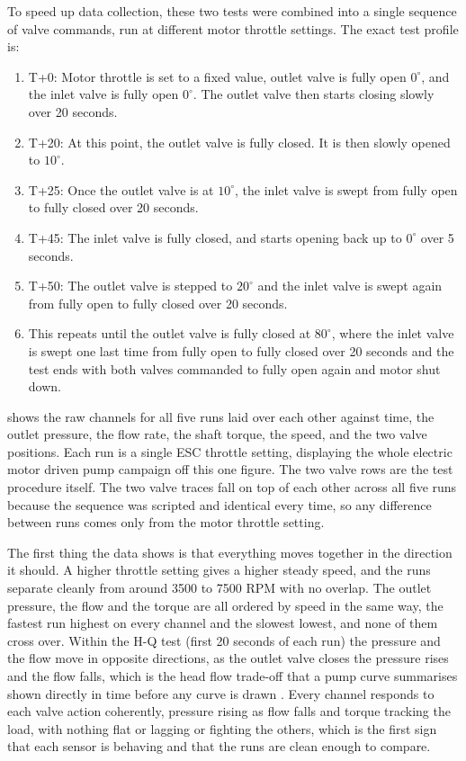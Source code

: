 To speed up data collection, these two tests were combined into a single sequence of valve commands, run at different motor throttle settings. The exact test profile is:

\begin{enumerate}
    \item T+0: Motor throttle is set to a fixed value, outlet valve is fully open $0^\circ$, and the inlet valve is fully open $0^\circ$. The outlet valve then starts closing slowly over 20 seconds.
    \item T+20: At this point, the outlet valve is fully closed. It is then slowly opened to $10^\circ$.
    \item T+25: Once the outlet valve is at $10^\circ$, the inlet valve is swept from fully open to fully closed over 20 seconds.
    \item T+45: The inlet valve is fully closed, and starts opening back up to $0^\circ$ over 5 seconds.
    \item T+50: The outlet valve is stepped to $20^\circ$ and the inlet valve is swept again from fully open to fully closed over 20 seconds.
    \item This repeats until the outlet valve is fully closed at $80^\circ$, where the inlet valve is swept one last time from fully open to fully closed over 20 seconds and the test ends with both valves commanded to fully open again and motor shut down.
\end{enumerate}

 shows the raw channels for all five runs laid over each other against time, the outlet pressure, the flow rate, the shaft torque, the speed, and the two valve positions. Each run is a single ESC throttle setting, displaying the whole electric motor driven pump campaign off this one figure. The two valve rows are the test procedure itself. The two valve traces fall on top of each other across all five runs because the sequence was scripted and identical every time, so any difference between runs comes only from the motor throttle setting.

The first thing the data shows is that everything moves together in the direction it should. A higher throttle setting gives a higher steady speed, and the runs separate cleanly from around 3500 to 7500 RPM with no overlap. The outlet pressure, the flow and the torque are all ordered by speed in the same way, the fastest run highest on every channel and the slowest lowest, and none of them cross over. Within the H-Q test (first 20 seconds of each run) the pressure and the flow move in opposite directions, as the outlet valve closes the pressure rises and the flow falls, which is the head flow trade-off that a pump curve summarises shown directly in time before any curve is drawn \cite{dixonFluidMechanicsThermodynamics1998}. Every channel responds to each valve action coherently, pressure rising as flow falls and torque tracking the load, with nothing flat or lagging or fighting the others, which is the first sign that each sensor is behaving and that the runs are clean enough to compare.

